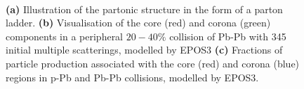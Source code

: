 \begin{figure}[H]
\\
\caption{\textbf{(a)} Illustration of the partonic structure in the form of a parton ladder. \cite{pierogEPOSLHCTest2015} \textbf{(b)} Visualisation of the core (red) and corona (green) components in a peripheral $20-40\%$ collision of Pb-Pb with 345 initial multiple scatterings, modelled by EPOS3 \cite{knospeHadronicResonanceProduction2016} \textbf{(c)} Fractions of particle production associated with the core (red) and corona (blue) regions in p-Pb and Pb-Pb collisions, modelled by EPOS3. \cite{knospeHadronicResonanceProduction2021}}
\label{fig:colls:epos}
\end{figure}